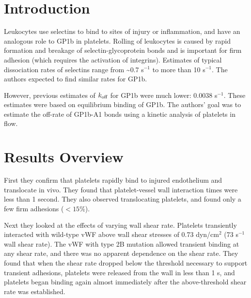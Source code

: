 \documentclass[
10pt, %
letterpaper, %
twocolumn, %
landscape %
]{article}
\newcommand{\tn}{\textnormal}
\begin{document}
\pagestyle{myheadings} %
\markright{\doctitle} %


\thispagestyle{plain} %

\printtitle %


\section*{Introduction} %

Leukocytes use selectins to bind to sites of injury or inflammation,
and have an analogous role to GP1b in platelets. Rolling of leukocytes
is caused by rapid formation and breakage of selectin-glycoprotein
bonds and is important for firm adhesion (which requires the
activation of integrins). Estimates of typical dissociation rates of
selectins range from \textasciitilde 0.7 s$^{-1}$ to more than 10
s$^{-1}$. The authors expected to find similar rates for GP1b. 

However, previous estimates of $k_\tn{off}$ for GP1b were much lower:
0.0038 s$^{-1}$. These estimates were based on equilibrium binding of
GP1b. The authors' goal was to estimate the off-rate of GP1b-A1 bonds
using a kinetic analysis of platelets in flow.


\section{Results Overview}

First they confirm that platelets rapidly bind to injured endothelium
and translocate in vivo. They found that platelet-vessel wall
interaction times were less than 1 second. They also observed
translocating platelets, and found only a few firm adhesions ($<
15\%$).

Next they looked at the effects of varying wall shear rate. Platelets
transiently interacted with wild-type vWF above wall shear stresses of 0.73
dyn/cm$^2$ (73 s$^{-1}$ wall shear rate). The vWF with type 2B
mutation allowed transient binding at any shear rate, and there was no
apparent dependence on the shear rate. They found that when the shear
rate dropped below the threshold necessary to support transient
adhesions, platelets were released from the wall in less than 1 s, and
platelets began binding again almost immediately after the
above-threshold shear rate was established. 
\end{document}
